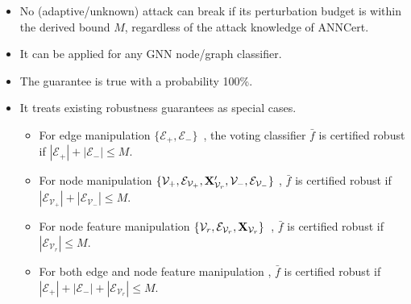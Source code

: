 \begin{itemize}[leftmargin=*]
\vspace{-2mm}
\item {No (adaptive/unknown) attack can break {\name} if its perturbation budget is within the derived bound $M$, regardless of the attack knowledge of ANNCert.}
\vspace{-2mm}
\item It can be applied for any GNN node/graph classifier. 
\vspace{-2mm}

\item The  guarantee is true with a probability 100\%. 
\vspace{-2mm}
\item It treats existing robustness guarantees as special cases. 
\begin{itemize}[leftmargin=*]
    \item For edge manipulation $\{\mathcal{E}_+,\mathcal{E}_-\}$~\cite{bojchevski2020efficient,wang2021certified,xia2024gnncert}, the voting classifier $\bar{f}$ is certified robust if $
    |\mathcal{E}_+|+|\mathcal{E}_-|\leq M$.  
    \vspace{-1mm}
    
    \item For node manipulation $\{\mathcal{V}_+, \mathcal{E}_{\mathcal{V}_+}, 
    {\bf X}'_{\mathcal{V}_r}, \mathcal{V}_-, \mathcal{E}_{\mathcal{V}_-}\}$ \cite{lai2023nodeawarebismoothingcertifiedrobustness}, %
    $\bar{f}$ is certified robust if $|\mathcal{E}_{\mathcal{V}_+}|+|\mathcal{E}_{\mathcal{V}_-}|\leq M$.
    \vspace{-1mm}
    
    \item For node feature manipulation $\{ \mathcal{V}_r, \mathcal{E}_{\mathcal{V}_r}, {\bf X}_{\mathcal{V}_r}\}$~\cite{jin2020certified,xia2024gnncert}, 
$\bar{f}$ is certified robust if $|\mathcal{E}_{\mathcal{V}_r}|\leq M$.
    \vspace{-1mm}
    \item For both edge {and} node feature manipulation \cite{xia2024gnncert}, 
    $\bar{f}$ is certified robust if $|\mathcal{E}_+|+|\mathcal{E}_-| + |\mathcal{E}_{\mathcal{V}_r}|\leq M$. 
    
\end{itemize}

\end{itemize}





